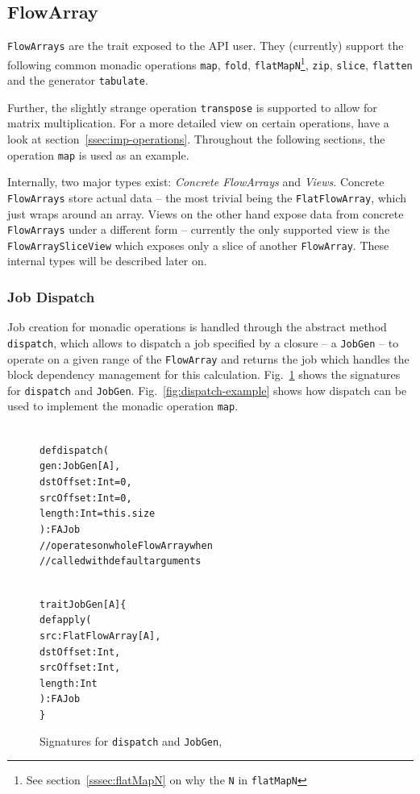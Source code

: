\documentclass[runningheads,a4paper,fleqn]{llncs}
\begin{document}
\subsection{FlowArray}
\label{ssec:flowarray}
\texttt{FlowArrays} are the trait exposed to the API user. They (currently)
support the following common monadic operations \texttt{map},
\texttt{fold}, \texttt{flatMapN}\footnote{See
  section~\ref{sssec:flatMapN} on why the \texttt{N} in
  \texttt{flatMapN}}, \texttt{zip}, \texttt{slice}, \texttt{flatten}
and the generator \texttt{tabulate}.

Further, the slightly strange operation \texttt{transpose} is
supported
to allow for matrix multiplication. For a more detailed view on
certain operations, have a look at
section~\ref{ssec:imp-operations}. Throughout the following sections,
the operation \texttt{map} is used as an example.

Internally, two major types exist: \emph{Concrete FlowArrays} and
\emph{Views}. Concrete \texttt{FlowArrays} store actual data -- the most
trivial being the \texttt{FlatFlowArray}, which just wraps around an
array. Views on the other hand expose data from
concrete \texttt{FlowArrays} under a different form -- currently the
only supported view is the \texttt{FlowArraySliceView} which exposes
only a slice of another \texttt{FlowArray}. These internal types will be
described later on.

\subsubsection{Job Dispatch}
Job creation for monadic operations is handled through the abstract
method \texttt{dispatch}, which allows to dispatch a job specified by
a closure -- a \texttt{JobGen} -- to operate on a given range of the
\texttt{FlowArray} and returns the job which handles the block dependency
management for this calculation. Fig.~\ref{fig:dispatch-code} shows the
signatures for \texttt{dispatch} and
\texttt{JobGen}. Fig.~\ref{fig:dispatch-example} shows how dispatch
can be used to implement the monadic operation \texttt{map}.

\begin{figure}
\begin{minipage}[t]{6cm}
\begin{alltt}
{\scriptsize
def dispatch(
  gen: JobGen[A],
  dstOffset: Int = 0,
  srcOffset: Int = 0,
  length: Int = this.size
): FAJob
// operates on whole FlowArray when
// called with default arguments
}
\end{alltt}
\end{minipage}
\begin{minipage}[t]{7cm}
\begin{alltt}
{\scriptsize
trait JobGen[A] \{
  def apply(
    src: FlatFlowArray[A],
    dstOffset: Int,
    srcOffset: Int,
    length: Int
  ): FAJob
\}
}
\end{alltt}
\end{minipage}
\caption{Signatures for \texttt{dispatch} and \texttt{JobGen}, }
\label{fig:dispatch-code}
\end{figure}
\end{document}
